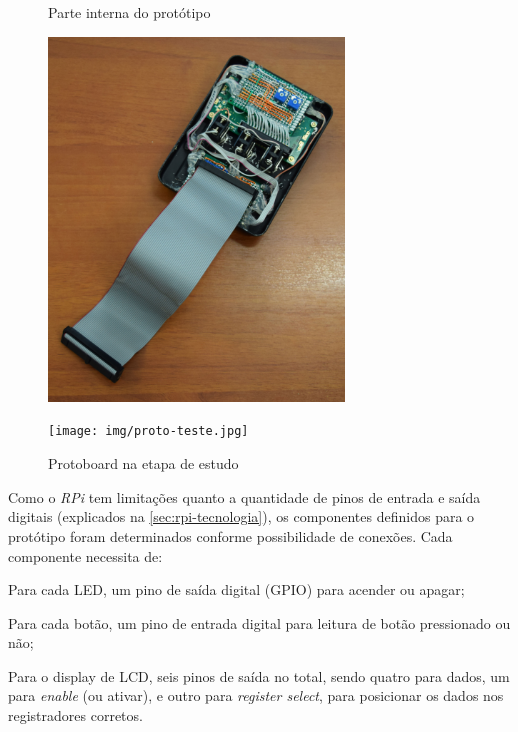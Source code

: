 \documentclass[
		12pt,				%
		openright,			%
		oneside,			%
		a4paper,			%
		chapter=TITLE,		%
		english,			%
		brazil				%
	]{abntex2}
\begin{document}
\begin{figure}[htb]
	\label{teste}
	\centering
 	\begin{minipage}{0.43\textwidth}
		\centering
		\caption{\label{fig:prot-interno}Parte interna do protótipo}
		\includegraphics[width=0.7\textwidth]{img/prot-interno.jpg}
	\end{minipage}
	\hfill
	\begin{minipage}{0.55\textwidth}
		\centering
		\caption{\label{fig:proto-teste}Protoboard na etapa de estudo}
		\texttt{[image: img/proto-teste.jpg]}
	\end{minipage}
\end{figure}

Como o \textit{RPi} tem limitações quanto a quantidade de pinos de entrada e saída digitais (explicados na \autoref{sec:rpi-tecnologia}), os componentes definidos para o protótipo foram determinados conforme possibilidade de conexões. Cada componente necessita de:

\begin{alineas}
	\item Para cada LED, um pino de saída digital (GPIO) para acender ou apagar;
	\item Para cada botão, um pino de entrada digital para leitura de botão pressionado ou não;
	\item Para o display de LCD, seis pinos de saída no total, sendo quatro para dados, um para \textit{enable} (ou ativar), e outro para \textit{register select}, para posicionar os dados nos registradores corretos.
\end{alineas}
\end{document}
